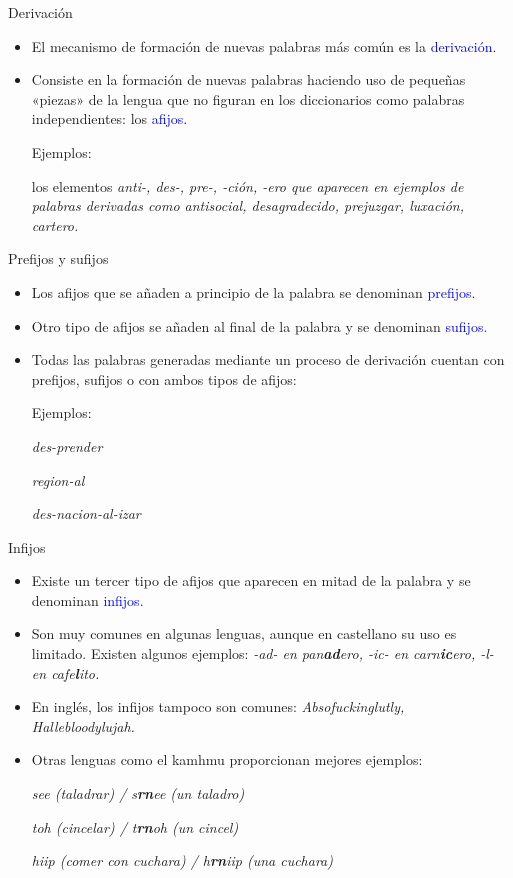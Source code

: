 \documentclass{beamer}
\begin{document}
\begin{frame}{Derivación}

\begin{itemize}
	\item El mecanismo de formación de nuevas palabras más común es la \textcolor{blue}{derivación}.
	\item Consiste en la formación de nuevas palabras haciendo uso de pequeñas «piezas» de la lengua que no figuran en los diccionarios como palabras independientes: los \textcolor{blue}{afijos}.
	
	Ejemplos:
	
	los elementos \it{anti-, des-, pre-, -ción, -ero} que aparecen en ejemplos de palabras derivadas como \it{antisocial, desagradecido, prejuzgar, luxación, cartero}.
	\end{itemize}
\end{frame}

\begin{frame}{Prefijos y sufijos}

\begin{itemize}
	\item Los afijos que se añaden a principio de la palabra se denominan \textcolor{blue}{prefijos}.
	\item Otro tipo de afijos se añaden al final de la palabra y se denominan \textcolor{blue}{sufijos}.
	\item Todas las palabras generadas mediante un proceso de derivación cuentan con prefijos, sufijos o con ambos tipos de afijos:
	
	Ejemplos:
	
	\it{des-prender} 

	\it{region-al} 

	\it{des-nacion-al-izar} 
\end{itemize}
\end{frame}

\begin{frame}{Infijos}

\begin{itemize}
	\item Existe un tercer tipo de afijos que aparecen en mitad de la palabra y se denominan \textcolor{blue}{infijos}.
	\item Son muy comunes en algunas lenguas, aunque en castellano su uso es limitado. Existen algunos ejemplos: \it{-ad-} en \it{pan\textbf{ad}ero}, \it{-ic-} en \it{carn\textbf{ic}ero}, \it{-l-} en \it{cafe\textbf{l}ito}.
	\item En inglés, los infijos tampoco son comunes: \it{Absofuckinglutly}, \it{Hallebloodylujah}.
	\item Otras lenguas como el kamhmu proporcionan mejores ejemplos:
	
	\it{see} (taladrar) / \it{s\textbf{rn}ee} (un taladro) 
	
	\it{toh} (cincelar) / \it{t\textbf{rn}oh} (un cincel) 
	
	\it{hiip} (comer con cuchara) / \it{h\textbf{rn}iip} (una cuchara) 
\end{itemize}
\end{frame}
\end{document}
